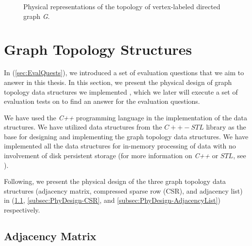 {\begin{figure}[H]
{        \label{fig:CSR_phy}
    }
\centering
    \caption{Physical representations of the topology of vertex-labeled directed graph \textit{G}.}
    \label{fig:GraphRopology_physical}
\end{figure}


\section{Graph Topology Structures}
\label{sec:PhyDesign-GraphTopology}

In (\ref{sec:EvalQuests}), we introduced a set of evaluation questions that we aim to answer in this thesis. In this section, we present the physical design of graph topology data structures we implemented , which we later will execute a set of evaluation tests on to find an answer for the evaluation questions.

We have used the \textit{C++} programming language in the implementation of the data structures. We have utilized data structures from the $C++-STL$ library as the base for designing and implementing the graph topology data structures. We have implemented all the data structures for in-memory processing of data with no involvement of disk persistent storage (for more information on \textit{C++} or $STL$, see \cite{josuttis2012c++}).

Following, we present the physical design of the three graph topology data structures (adjacency matrix, compressed sparse row (CSR), and adjacency list) in (\ref{subsec:PhyDesign-AdjacencyMatrix}, \ref{subsec:PhyDesign-CSR}, and \ref{subsec:PhyDesign-AdjacencyList}) respectively.



\subsection{Adjacency Matrix}
\label{subsec:PhyDesign-AdjacencyMatrix}

}
